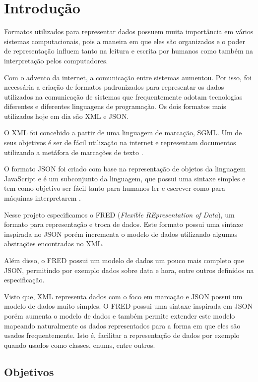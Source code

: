 \chapter[Introdução]{Introdução}

Formatos utilizados para representar dados possuem muita importância 
em vários sistemas computacionais, pois a maneira em que eles são organizados
e o poder de representação influem tanto na leitura e escrita por humanos como também 
na interpretação pelos computadores.

Com o advento da internet, a comunicação entre sistemas aumentou.
Por isso, foi necessária a criação de formatos padronizados para representar
os dados utilizados na comunicação de sistemas que frequentemente adotam 
tecnologias diferentes e diferentes linguagens de programação. 
Os dois formatos mais utilizados hoje em dia são XML e JSON.

O XML foi concebido a partir de uma linguagem de marcação, SGML.
Um de seus objetivos é ser de fácil utilização na internet e representam 
documentos utilizando a metáfora de marcações de texto \cite{XML}.

O formato JSON foi criado com base na representação de objetos 
da linguagem JavaScript e é um subconjunto da linguagem, que
possui uma sintaxe simples e tem como objetivo ser fácil tanto para 
humanos ler e escrever como para máquinas interpretarem \cite{ecma404}.

Nesse projeto especificamos o FRED (\textit{Flexible REpresentation of Data}), 
um formato para representação e troca de dados. Este formato possui uma sintaxe
inspirada no JSON porém incrementa o modelo de dados utilizando algumas 
abstrações encontradas no XML.

Além disso, o FRED possui um modelo de dados um pouco mais completo que JSON,
permitindo por exemplo dados sobre data e hora, entre outros
definidos na especificação.

Visto que, XML representa dados com o foco em marcação e JSON 
possui um modelo de dados muito simples. O FRED possui uma sintaxe
inspirada em JSON porém aumenta o modelo
de dados e também permite extender este modelo mapeando naturalmente os 
dados representados para a forma em que eles são usados 
frequentemente. Isto é, facilitar a representação de dados por exemplo
quando usados como classes, enums, entre outros.



\section{Objetivos}
\label{sec:objective}


